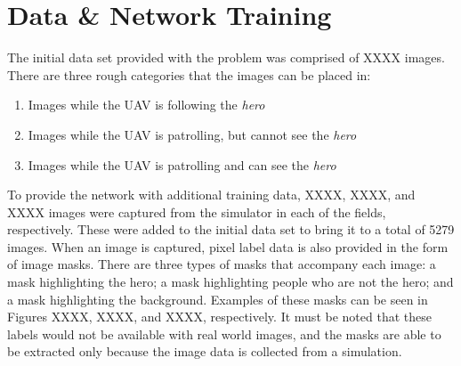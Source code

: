 \documentclass[a4paper]{article}
\begin{document}
\section{Data \& Network Training}
The initial data set provided with the problem was comprised of XXXX images. There are three rough categories that the images can be placed in:
\begin{enumerate}
\item Images while the UAV is following the \textit{hero}
\item Images while the UAV is patrolling, but cannot see the \textit{hero}
\item Images while the UAV is patrolling and can see the \textit{hero}
\end{enumerate}
To provide the network with additional training data, XXXX, XXXX, and XXXX images were captured from the simulator in each of the fields, respectively. These were added to the initial data set to bring it to a total of 5279 images. When an image is captured, pixel label data is also provided in the form of image masks. There are three types of masks that accompany each image: a mask highlighting the hero; a mask highlighting people who are not the hero; and a mask highlighting the background. Examples of these masks can be seen in Figures XXXX, XXXX, and XXXX, respectively. It must be noted that these labels would not be available with real world images, and the masks are able to be extracted only because the image data is collected from a simulation.
\begin{figure}[h]
\begin{minipage}{0.45\textwidth}
\centering
{}
\end{minipage}
\hspace{1cm}
\begin{minipage}{0.45\textwidth}
\centering
{}
\end{minipage}
\end{figure}
\end{document}
